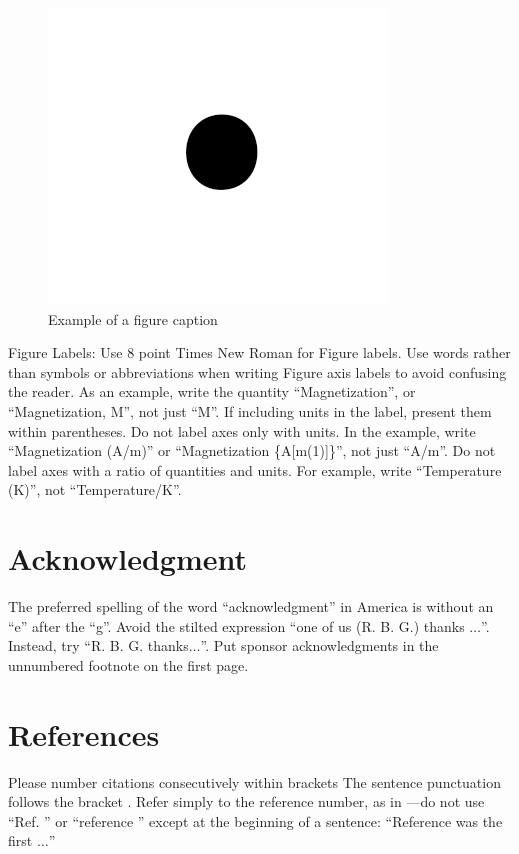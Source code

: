 \documentclass[conference]{IEEEtran}
\begin{document}
\begin{figure}[htbp]
\centering
\includegraphics[width=.9\linewidth]{./images/figure1.png}
\caption{Example of a figure caption}
\end{figure}

Figure Labels: Use 8 point Times New Roman for Figure labels. Use words rather than symbols or abbreviations when writing Figure axis labels to avoid confusing the reader. As an example, write the quantity ``Magnetization'', or ``Magnetization, M'', not just ``M''. If including units in the label, present them within parentheses. Do not label axes only with units. In the example, write ``Magnetization (A/m)'' or ``Magnetization \{A[m(1)]\}'', not just ``A/m''. Do not label axes with a ratio of quantities and units. For example, write ``Temperature (K)'', not ``Temperature/K''.

\section*{Acknowledgment}
\label{sec:orgbe4a85b}
  The preferred spelling of the word ``acknowledgment'' in America is without an ``e'' after the ``g''. Avoid the stilted expression ``one of us (R. B. G.) thanks \(\ldots\)''. Instead, try ``R. B. G. thanks\(\ldots\)''. Put sponsor 
acknowledgments in the unnumbered footnote on the first page.

\section*{References}
\label{sec:orgf3e3c50}
  Please number citations consecutively within brackets \cite{huang21_fusion_algor_visib_infrar_image}  The sentence punctuation follows the bracket \cite{jacobs63_fine_partic_thin_films_exchan}. Refer simply to the reference number, as in \cite{maxwellil_magnet_probl}---do not use ``Ref. \cite{muller55_certain_infin_integ_invol_bessel_funct}'' or ``reference \cite{maxwellil_magnet_probl}'' except at 
the beginning of a sentence: ``Reference \cite{b3} was the first \(\ldots\)''
\end{document}

